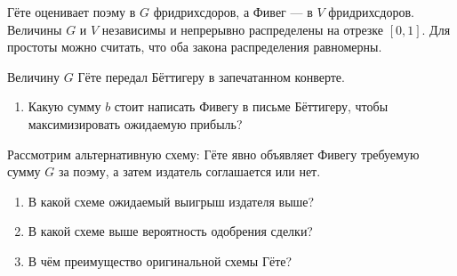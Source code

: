 \documentclass[12pt]{article}
\begin{document}
\begin{enumerate}[resume]
Гёте оценивает поэму в $G$ фридрихсдоров, а Фивег — в $V$ фридрихсдоров. 
Величины $G$ и $V$ независимы и непрерывно распределены на отрезке $[0, 1]$.
Для простоты можно считать, что оба закона распределения равномерны. 

Величину $G$ Гёте передал Бёттигеру в запечатанном конверте. 

\begin{enumerate}
  \item Какую сумму $b$ стоит написать Фивегу в письме Бёттигеру, чтобы максимизировать ожидаемую прибыль?
\end{enumerate}

Рассмотрим альтернативную схему: Гёте явно объявляет Фивегу требуемую сумму $G$ за поэму, 
а затем издатель соглашается или нет.

\begin{enumerate}[resume]
  \item В какой схеме ожидаемый выигрыш издателя выше? 
  \item В какой схеме выше вероятность одобрения сделки?
  \item В чём преимущество оригинальной схемы Гёте?
\end{enumerate}



\end{enumerate}
\end{document}
